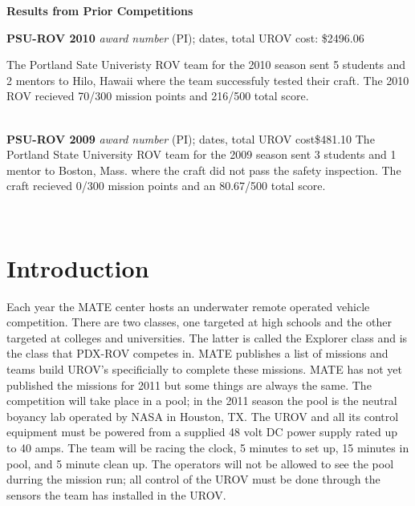 \documentclass{proposalnsf}
\begin{document}
\newpage


\renewcommand{\thepage} {D--\arabic{page}}

\newpage

\centerline{\bf Results from Prior Competitions}

\noindent
{\bf PSU-ROV 2010}
{\it award number} (PI); dates, total UROV cost: \$2496.06

The Portland Sate Univeristy ROV team for the 2010 season sent 5 students and 2 mentors to Hilo, Hawaii where the team successfuly tested their craft. The 2010 ROV
recieved 70/300 mission points and 216/500 total score.

\ \\
\noindent
{\bf PSU-ROV 2009}
{\it award number} (PI); dates, total UROV cost\$481.10
The Portland State University ROV team for the 2009 season sent 3 students and 1 mentor to Boston, Mass. where the craft did not pass the safety inspection.
The craft recieved 0/300 mission points and an 80.67/500 total score. 


\ \\

\section{Introduction}

Each year the MATE center hosts an underwater remote operated vehicle competition. There are two classes, one targeted at high schools and 
the other targeted at colleges and universities. The latter is called the Explorer class and is the class that PDX-ROV competes in. MATE 
publishes a list of missions and teams build UROV's specificially to complete these missions. MATE has not yet published the missions for 2011
 but some things are always the same. The competition will take place in a pool; in the 2011 season the pool is the neutral boyancy lab
operated by NASA in Houston, TX. The UROV and all its control equipment must be powered from a supplied 48 volt DC power supply rated 
up to 40 amps. The team will be racing the clock, 5 minutes to set up, 15 minutes in pool, and 5 minute clean up. The operators will not 
be allowed to see the pool durring the mission run; all control of the UROV must be done through the sensors the team has installed in the UROV. 
\end{document}
